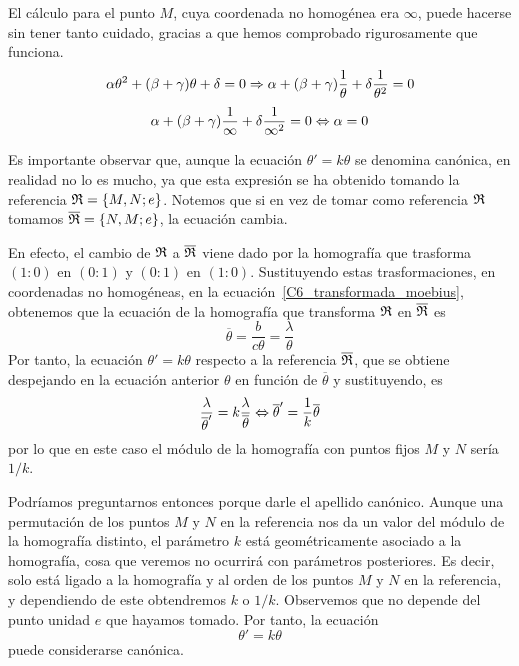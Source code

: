 \begin{obs}
	El cálculo para el punto $M$, cuya coordenada no homogénea era $\infty$, puede hacerse sin tener tanto cuidado, gracias a que hemos comprobado rigurosamente que funciona.
	\begin{equation*}
		\alpha\theta^2+(\beta+\gamma)\theta+\delta=0\Rightarrow\alpha+(\beta+\gamma)\frac{1}{\theta}+\delta\frac{1}{\theta^2}=0
	\end{equation*}
	\begin{equation*}
		\alpha+(\beta+\gamma)\frac{1}{\infty}+\delta\frac{1}{\infty^2}=0\Leftrightarrow \alpha=0
	\end{equation*}
\end{obs}
Es importante observar que, aunque la ecuación $\theta'=k\theta$ se denomina canónica, en realidad no lo es mucho, ya que esta expresión se ha obtenido tomando la referencia $\mathfrak{R}=\{M,N;e\}$. Notemos que si en vez de tomar como referencia $\mathfrak{R}$ tomamos $\overline{\mathfrak{R}}=\{N,M;e\}$, la ecuación cambia.

En efecto, el cambio de $\mathfrak{R}$ a $\overline{\mathfrak{R}}$ viene dado por la homografía que trasforma $(1:0)$ en $(0:1)$ y $(0:1)$ en $(1:0)$. Sustituyendo estas trasformaciones, en coordenadas no homogéneas, en la ecuación~\eqref{C6_transformada_moebius}, obtenemos que la ecuación de la homografía que transforma $\mathfrak{R}$ en $\overline{\mathfrak{R}}$ es
\begin{equation*}
	\overline{\theta}=\frac{b}{c\theta}=\frac{\lambda}{\theta}
\end{equation*}
Por tanto, la ecuación $\theta'=k\theta$ respecto a la referencia $\overline{\mathfrak{R}}$, que se obtiene despejando en la ecuación anterior $\theta$ en función de $\overline{\theta}$ y sustituyendo, es
\begin{equation*}
	\frac{\lambda}{\overline{\theta}'}=k\frac{\lambda}{\overline{\theta}}\Leftrightarrow \overline{\theta}'=\frac{1}{k}\overline{\theta}
\end{equation*}
por lo que en este caso el módulo de la homografía con puntos fijos $M$ y $N$ sería $1/k$. 

Podríamos preguntarnos entonces porque darle el apellido canónico. Aunque una permutación de los puntos $M$ y $N$ en la referencia nos da un valor del módulo de la homografía distinto, el parámetro $k$ está geométricamente asociado a la homografía, cosa que veremos no ocurrirá con parámetros posteriores. Es decir, solo está ligado a la homografía y al orden de los puntos $M$ y $N$ en la referencia, y dependiendo de este obtendremos $k$ o $1/k$. Observemos que no depende del punto unidad $e$ que hayamos tomado. Por tanto, la ecuación
\begin{equation}
	\label{C6_theta_ktheta}
	\theta'=k\theta
\end{equation}
puede considerarse canónica.

